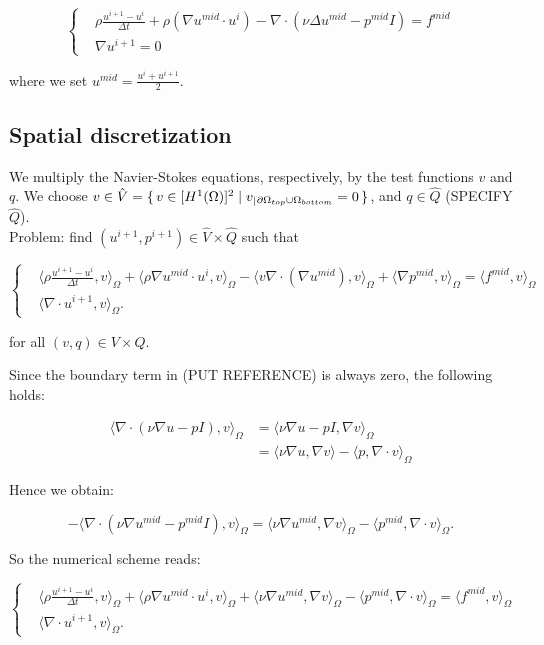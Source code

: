 \documentclass[11pt,a4paper,titlepage]{report}
\begin{document}
\[
\left\{  
\begin{aligned}
& \rho \frac{u^{i+1} - u^i}{\Delta t} + \rho (\nabla u^{mid} \cdot u^i) - \nabla \cdot (\nu \Delta u^{mid} - p^{mid}I) = f^{mid} \\
& \nabla u^{i+1} = 0
\end{aligned}
\right.
\]

where we set $u^{mid} = \frac{u^i + u^{i+1}}{2}$.

\subsection{Spatial discretization}
We multiply the Navier-Stokes equations, respectively, by the test functions $v$ and $q$. We choose $v \in \hat{V} = \set{v \in [H^1(\Omega)]^2 | v_|{_{\partial \Omega_{top} \cup \Omega_{bottom}}} = 0}$, and $q \in \hat{Q}$ (SPECIFY $\hat{Q}$). \\
Problem: find $(u^{i+1}, p^{i+1}) \in \hat{V} \times \hat{Q}$ such that 

\[
\left\{  
\begin{aligned}
& \langle \rho \frac{u^{i+1} - u^i}{\Delta t},v \rangle_\Omega
+ \langle \rho \nabla u^{mid} \cdot u^i  ,v \rangle_\Omega
- \langle v \nabla \cdot (\nabla u^{mid}) ,v \rangle_\Omega
+ \langle \nabla p^{mid} ,v \rangle_\Omega = \langle f^{mid} ,v \rangle_\Omega \\
& \langle \nabla \cdot u^{i+1},v \rangle_\Omega.
\end{aligned}
\right.
\]

for all $(v,q) \in V \times Q$.

Since the boundary term in (PUT REFERENCE) is always zero, the following holds:

\[
\begin{aligned}
\langle \nabla \cdot (\nu \nabla u - pI) ,v \rangle_\Omega & = \langle \nu \nabla u - pI ,\nabla v \rangle_\Omega \\
														& = \langle \nu \nabla u  ,\nabla v \rangle  - \langle p ,\nabla \cdot v \rangle_\Omega										
\end{aligned}
\]

Hence we obtain:

\[
- \langle \nabla \cdot (\nu \nabla u^{mid} - p^{mid}I) ,v \rangle_{\Omega} = \langle \nu \nabla u^{mid}, \nabla v \rangle_\Omega -  \langle p^{mid}, \nabla \cdot v \rangle_\Omega.
\]

So the numerical scheme reads:

\[
\left\{  
\begin{aligned}
& \langle \rho \frac{u^{i+1} - u^i}{\Delta t},v \rangle_\Omega
+ \langle \rho \nabla u^{mid} \cdot u^i  ,v \rangle_\Omega
+ \langle \nu \nabla u^{mid}, \nabla v \rangle_\Omega
- \langle p^{mid} , \nabla \cdot v \rangle_\Omega = \langle f^{mid} ,v \rangle_\Omega \\
& \langle \nabla \cdot u^{i+1},v \rangle_\Omega.
\end{aligned}
\right.
\]
\end{document}
